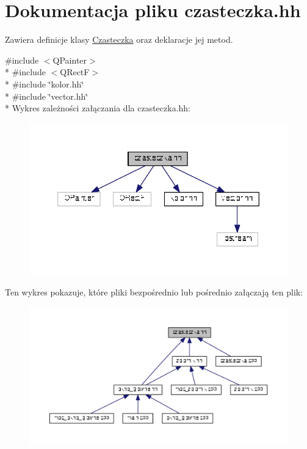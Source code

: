 \hypertarget{czasteczka_8hh}{}\section{Dokumentacja pliku czasteczka.\+hh}
\label{czasteczka_8hh}


Zawiera definicje klasy \hyperlink{class_czasteczka}{Czasteczka} oraz deklaracje jej metod.  


{\ttfamily \#include $<$Q\+Painter$>$}\\*
{\ttfamily \#include $<$Q\+Rect\+F$>$}\\*
{\ttfamily \#include \char`\"{}kolor.\+hh\char`\"{}}\\*
{\ttfamily \#include \char`\"{}vector.\+hh\char`\"{}}\\*
Wykres zależności załączania dla czasteczka.\+hh\+:\nopagebreak
\begin{figure}[H]
\begin{center}
\leavevmode
\includegraphics[width=350pt]{czasteczka_8hh__incl}
\end{center}
\end{figure}
Ten wykres pokazuje, które pliki bezpośrednio lub pośrednio załączają ten plik\+:\nopagebreak
\begin{figure}[H]
\begin{center}
\leavevmode
\includegraphics[width=350pt]{czasteczka_8hh__dep__incl}
\end{center}
\end{figure}
